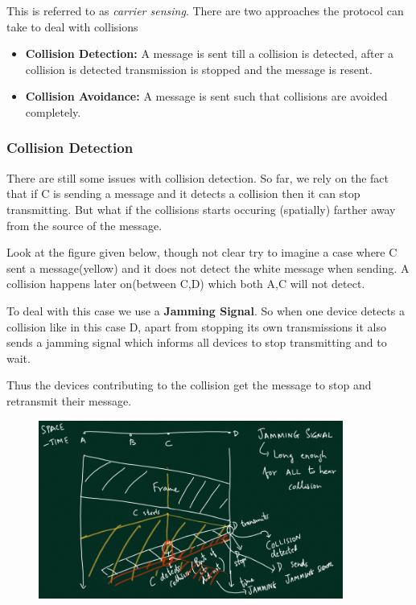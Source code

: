 \documentclass[12pt]{article}
\begin{document}
This is referred to as \textit{carrier sensing}. There are two approaches the 
protocol can take to deal with collisions

\begin{itemize}
    \item \textbf{Collision Detection:} A message is sent till a collision is 
    detected, after a collision is detected transmission is stopped and the message is resent. 
    \item \textbf{Collision Avoidance:} A message is sent such that collisions are avoided completely. 
\end{itemize}

\subsubsection{Collision Detection}

There are still some issues with collision detection. So far, we rely on the 
fact that if C is sending a message and it detects a collision then it can stop transmitting. 
But what if the collisions starts occuring (spatially) farther away from the source of the message.


Look at the figure given below, though not clear try to imagine a case where C sent a message(yellow) and it does not 
detect the white message when sending. A collision happens later on(between C,D) which both A,C will not detect.

To deal with this case we use a \textbf{Jamming Signal}. So when one device detects a collision like 
in this case D, apart from stopping its own transmissions it also sends a jamming signal which informs all devices to stop transmitting and to 
wait. 

Thus the devices contributing to the collision get the message to stop and retransmit their message. 




\begin{figure}[H]
    \centering
    \includegraphics*[width = 10cm]{Diagrams/CD.png}
\end{figure}
\end{document}
